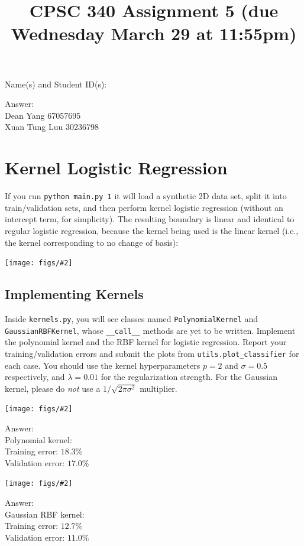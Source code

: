 \documentclass{article}
\def\ans#1{\par\gre{Answer: #1}}
\def\blu#1{{\color{blu}#1}}
\def\gre#1{{\color{gre}#1}}
\newcommand{\centerfig}[2]{\begin{center}\texttt{[image: figs/\#2]}\end{center}}
\begin{document}
\title{CPSC 340 Assignment 5 (due Wednesday March 29 at 11:55pm)}
\author{}
\date{}
\maketitle
\vspace{-4em}


\blu{Name(s) and Student ID(s):}
\ans{\\
Dean Yang 67057695\\
Xuan Tung Luu 30236798
}

\section{Kernel Logistic Regression}

If you run \verb|python main.py 1| it will load a synthetic 2D data set, split it into train/validation sets, and then perform kernel logistic regression (without an intercept term, for simplicity). The resulting boundary is linear and identical to regular logistic regression, because the kernel being used is the linear kernel (i.e., the kernel corresponding to no change of basis):
\centerfig{0.5}{logReg.png}

\subsection{Implementing Kernels}

Inside \texttt{kernels.py}, you will see classes named \texttt{PolynomialKernel} and \texttt{GaussianRBFKernel}, whose \verb|__call__| methods are yet to be written.
\blu{Implement the polynomial kernel and the RBF kernel for logistic regression. Report your training/validation errors and submit the plots from \texttt{utils.plot\_classifier} for each case.}
You should use the kernel hyperparameters $p=2$ and $\sigma=0.5$ respectively,
and $\lambda=0.01$ for the regularization strength.
For the Gaussian kernel, please do \emph{not} use a $1/\sqrt{2\pi\sigma^2}$ multiplier.
\centerfig{0.6}{logRegPolynomial}
\ans{\\
Polynomial kernel:\\
Training error: $18.3\%$\\
Validation error: $17.0\%$\\
}

\centerfig{0.6}{logRegGaussian}
\ans{\\
Gaussian RBF kernel:\\
Training error: $12.7\%$ \\
Validation error: $11.0\%$ \\
}
\end{document}
